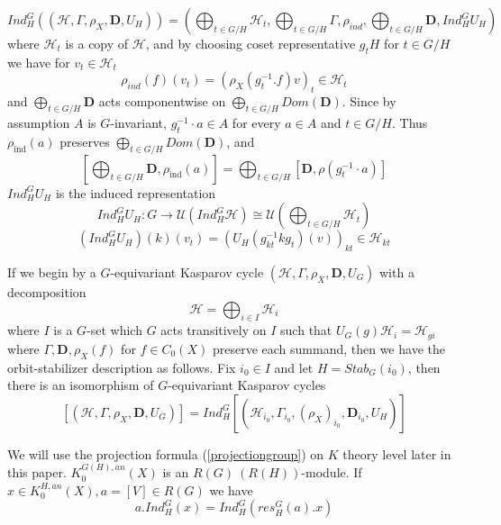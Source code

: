 \documentclass[11pt,leqno,twoside]{amsart}
\theoremstyle{plainsl}
\theoremstyle{definition}
\newcommand{\cH}{\mathcal{H}}
\newcommand{\bD}{\mathbf{D}}
\begin{document}
\[Ind^G_H\left((\mathcal{H},\Gamma,\rho_X,\bD,U_H)\right)=( \bigoplus_{t\in G/H} \mathcal{H}_{t},\bigoplus_{t\in G/H}  \Gamma, \rho_{ind},\bigoplus_{t\in G/H}  \bD,Ind^G_H U_H)\]
where $\cH_{t}$ is a copy of $\cH$, and by choosing coset representative $g_tH$ for $t\in G/H$ we have for $v_t\in \cH_t$
\[\rho_{ind}(f)(v_t)=(\rho_X(g_t^{-1}.f)v)_t\in  \cH_t\]
and $\bigoplus_{t\in G/H}  \bD$ acts componentwise on $\bigoplus_{t\in G/H}  Dom(\bD)$. Since by assumption $A$ is $G$-invariant, $g_t^{-1}\cdot a\in A$
for every $a\in A$ and $t\in G/H$. Thus
$\rho_{\mathrm{ind}}(a)$ preserves
$\bigoplus_{t\in G/H}  Dom(\bD)$, and
\[
[\bigoplus_{t\in G/H}  \bD,\rho_{\mathrm{ind}}(a)]
=
\bigoplus_{t\in G/H}
[\bD,\rho(g_t^{-1}\cdot a)]
\]
$Ind^G_H U_H$ is the induced representation
\[Ind^G_H U_H: G\rightarrow \mathcal{U}(Ind^G_H \cH)\cong \mathcal{U}(\bigoplus_{t\in G/H} \mathcal{H}_{t})\]
\[\left(Ind^G_H U_H \right)(k)(v_t)=\left(U_H(g^{-1}_{kt}kg_t)(v)\right)_{kt}\in \cH_{kt}\]













If we begin by a $G$-equivariant Kasparov cycle $(\mathcal{H},\Gamma,\rho_X,\bD,U_G)$ with a decomposition $$\cH=\bigoplus_{i\in I}\cH_i$$ where $I$ is a $G$-set which $G$ acts transitively on $I$ such that $U_G(g)\cH_i=\cH_{gi}$ where $\Gamma, \bD, \rho_X(f)$ for $f\in C_0(X)$ preserve each summand, then we have the orbit-stabilizer description as follows.  Fix $i_0\in I$ and let $H=Stab_G(i_0)$, then there is an isomorphism of $G$-equivariant Kasparov cycles
\begin{equation}\label{indcutfomrulakcycles}
[(\mathcal{H},\Gamma,\rho_X,\bD,U_G)] = Ind^G_H[(\mathcal{H}_{i_0},\Gamma_{i_0},(\rho_X)_{i_0},\bD_{i_0},U_H)]
\end{equation}

We will use the projection formula (\ref{projectiongroup}) on $K$ theory level later in this paper. $K_0^{G(H),an}(X)$ is an $R(G)~\left(R(H)\right)$-module. If $x\in K_0^{H,an}(X), a=[V]\in R(G)$ we have
\begin{equation}\label{projectionfomrk}
    a.Ind^G_H(x)=Ind^G_H(res^G_H(a).x)
\end{equation}
\end{document}
